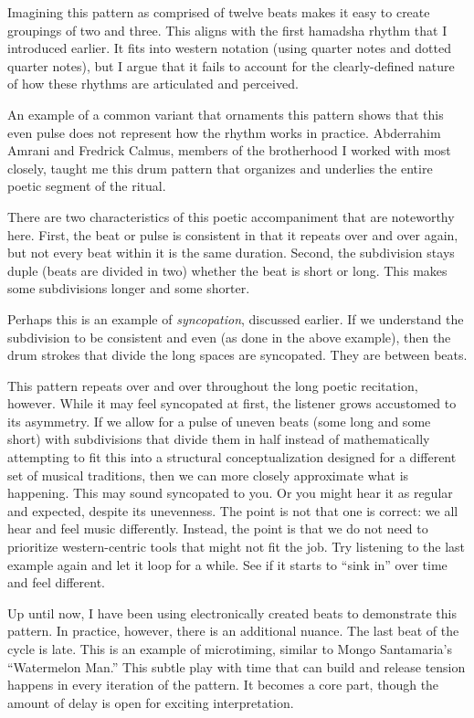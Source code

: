 \documentclass[twoside]{article}
\begin{document}
\hypertarget{example21}{}

Imagining this pattern as comprised of twelve beats makes it easy to
create groupings of two and three. This aligns with the first hamadsha
rhythm that I introduced earlier. It fits into western notation (using
quarter notes and dotted quarter notes), but I argue that it fails to
account for the clearly-defined nature of how these rhythms are
articulated and perceived.

An example of a common variant that ornaments this pattern shows that
this even pulse does not represent how the rhythm works in practice.
Abderrahim Amrani and Fredrick Calmus, members of the brotherhood I
worked with most closely, taught me this drum pattern that organizes and
underlies the entire poetic segment of the ritual.

\hypertarget{example22}{}

There are two characteristics of this poetic accompaniment that are
noteworthy here. First, the beat or pulse is consistent in that it
repeats over and over again, but not every beat within it is the same
duration. Second, the subdivision stays duple (beats are divided in two)
whether the beat is short or long. This makes some subdivisions longer
and some shorter.

Perhaps this is an example of \emph{syncopation}, discussed earlier. If
we understand the subdivision to be consistent and even (as done in the
above example), then the drum strokes that divide the long spaces are
syncopated. They are between beats.

This pattern repeats over and over throughout the long poetic
recitation, however. While it may feel syncopated at first, the listener
grows accustomed to its asymmetry. If we allow for a pulse of uneven
beats (some long and some short) with subdivisions that divide them in
half instead of mathematically attempting to fit this into a structural
conceptualization designed for a different set of musical traditions,
then we can more closely approximate what is happening. This may sound
syncopated to you. Or you might hear it as regular and expected, despite
its unevenness. The point is not that one is correct: we all hear and
feel music differently. Instead, the point is that we do not need to
prioritize western-centric tools that might not fit the job. Try
listening to the last example again and let it loop for a while. See if
it starts to ``sink in'' over time and feel different.

Up until now, I have been using electronically created beats to
demonstrate this pattern. In practice, however, there is an additional
nuance. The last beat of the cycle is late. This is an example of
microtiming, similar to Mongo Santamaria's ``Watermelon Man.'' This
subtle play with time that can build and release tension happens in
every iteration of the pattern. It becomes a core part, though the
amount of delay is open for exciting interpretation.
\end{document}

